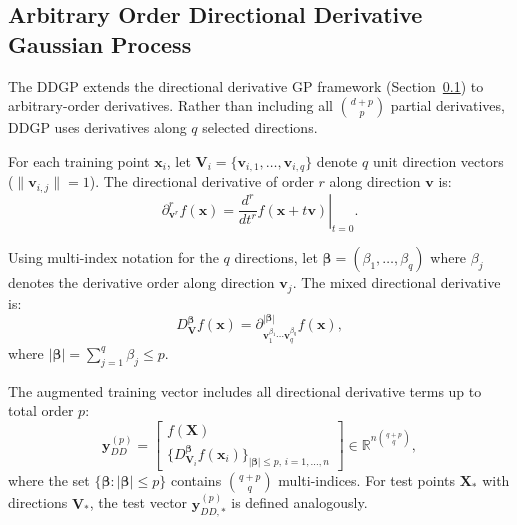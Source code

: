 \documentclass[12pt]{article}
\begin{document}
\subsection{Arbitrary Order Directional Derivative Gaussian Process}
\label{subsec:ddgp}

The DDGP extends the directional derivative GP framework (Section~\ref{subsec:ddgp}) to arbitrary-order derivatives. Rather than including all $\binom{d+p}{p}$ partial derivatives, DDGP uses derivatives along $q$ selected directions.

For each training point $\mathbf{x}_i$, let $\mathbf{V}_i = \{\mathbf{v}_{i,1}, \ldots, \mathbf{v}_{i,q}\}$ denote $q$ unit direction vectors ($\|\mathbf{v}_{i,j}\| = 1$). The directional derivative of order $r$ along direction $\mathbf{v}$ is:
\begin{equation}
	\partial^r_{\mathbf{v}^r} f(\mathbf{x}) = \left.\frac{d^r}{dt^r} f(\mathbf{x} + t\mathbf{v})\right|_{t=0}.
\end{equation}

Using multi-index notation for the $q$ directions, let $\boldsymbol{\beta} = (\beta_1, \ldots, \beta_q)$ where $\beta_j$ denotes the derivative order along direction $\mathbf{v}_j$. The mixed directional derivative is:
\begin{equation}
	D_{\mathbf{V}}^{\boldsymbol{\beta}} f(\mathbf{x}) = \partial^{|\boldsymbol{\beta}|}_{\mathbf{v}_1^{\beta_1} \cdots \mathbf{v}_q^{\beta_q}} f(\mathbf{x}),
\end{equation}
where $|\boldsymbol{\beta}| = \sum_{j=1}^q \beta_j \leq p$.

The augmented training vector includes all directional derivative terms up to total order $p$:
\begin{equation}
	\label{eqn:ddgp_aug_vector}
	\mathbf{y}_{DD}^{(p)} = 
	\begin{bmatrix} 
		f(\mathbf{X}) \\
		\{D_{\mathbf{V}_i}^{\boldsymbol{\beta}} f(\mathbf{x}_i)\}_{|\boldsymbol{\beta}| \leq p, \, i=1,\ldots,n}
	\end{bmatrix} \in \mathbb{R}^{n\binom{q+p}{q}},
\end{equation}
where the set $\{\boldsymbol{\beta} : |\boldsymbol{\beta}| \leq p\}$ contains $\binom{q+p}{q}$ multi-indices. For test points $\mathbf{X}_*$ with directions $\mathbf{V}_*$, the test vector $\mathbf{y}_{DD,*}^{(p)}$ is defined analogously.
\end{document}
